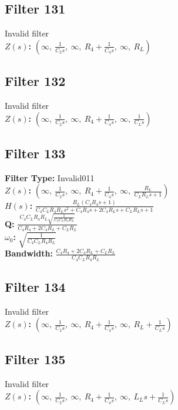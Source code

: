 \documentclass{article}
\begin{document}
\subsection*{Filter 131}
Invalid filter \\ 
\textbf{$Z(s)$:} $\left( \infty, \  \frac{1}{C_{2} s}, \  \infty, \  R_{4} + \frac{1}{C_{4} s}, \  \infty, \  R_{L}\right)$ \\ 
\subsection*{Filter 132}
Invalid filter \\ 
\textbf{$Z(s)$:} $\left( \infty, \  \frac{1}{C_{2} s}, \  \infty, \  R_{4} + \frac{1}{C_{4} s}, \  \infty, \  \frac{1}{C_{L} s}\right)$ \\ 
\subsection*{Filter 133}
\textbf{Filter Type:} Invalid011 \\ 
\textbf{$Z(s)$:} $\left( \infty, \  \frac{1}{C_{2} s}, \  \infty, \  R_{4} + \frac{1}{C_{4} s}, \  \infty, \  \frac{R_{L}}{C_{L} R_{L} s + 1}\right)$ \\ 
\textbf{$H(s)$:} $\frac{R_{L} \left(C_{4} R_{4} s + 1\right)}{C_{4} C_{L} R_{4} R_{L} s^{2} + C_{4} R_{4} s + 2 C_{4} R_{L} s + C_{L} R_{L} s + 1}$ \\ 
\textbf{Q:} $\frac{C_{4} C_{L} R_{4} R_{L} \sqrt{\frac{1}{C_{4} C_{L} R_{4} R_{L}}}}{C_{4} R_{4} + 2 C_{4} R_{L} + C_{L} R_{L}}$ \\ 
\textbf{$\omega_0$:} $\sqrt{\frac{1}{C_{4} C_{L} R_{4} R_{L}}}$ \\ 
\textbf{Bandwidth:} $\frac{C_{4} R_{4} + 2 C_{4} R_{L} + C_{L} R_{L}}{C_{4} C_{L} R_{4} R_{L}}$ \\ 
\subsection*{Filter 134}
Invalid filter \\ 
\textbf{$Z(s)$:} $\left( \infty, \  \frac{1}{C_{2} s}, \  \infty, \  R_{4} + \frac{1}{C_{4} s}, \  \infty, \  R_{L} + \frac{1}{C_{L} s}\right)$ \\ 
\subsection*{Filter 135}
Invalid filter \\ 
\textbf{$Z(s)$:} $\left( \infty, \  \frac{1}{C_{2} s}, \  \infty, \  R_{4} + \frac{1}{C_{4} s}, \  \infty, \  L_{L} s + \frac{1}{C_{L} s}\right)$ \\ 
\end{document}
